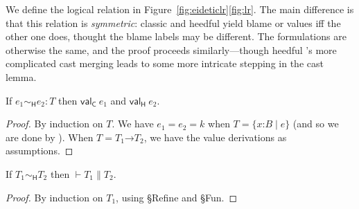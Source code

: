 \documentclass[9pt]{extarticle}
\newcommand{\reflr}{\ifpopl\ref{fig:eideticlr}\else\ref{fig:lr}\fi}
\newcommand{\ottnt}[1]{\mathit{#1}}
\newcommand{\ottsym}[1]{#1}
\begin{document}
{We define the logical relation in Figure~\reflr.
The main difference is that this relation is \textit{symmetric}:
classic and heedful \lambdah yield blame or values iff the other one
does, thought the blame labels may be different. The formulations are
otherwise the same, and the proof proceeds similarly---though heedful
\lambdah's more complicated cast merging leads to some more intricate
stepping in the cast lemma.

\begin{lemma}
  \label{lem:heedfullrvalue}
  If $ \ottnt{e_{{\mathrm{1}}}}   \sim _{  \mathsf{H}  }  \ottnt{e_{{\mathrm{2}}}}  :  \ottnt{T} $ then $ \mathsf{val} _{  \mathsf{C}  }~ \ottnt{e_{{\mathrm{1}}}} $ and $ \mathsf{val} _{  \mathsf{H}  }~ \ottnt{e_{{\mathrm{2}}}} $.
\begin{proof}
    By induction on $\ottnt{T}$. We have $\ottnt{e_{{\mathrm{1}}}}  \ottsym{=}  \ottnt{e_{{\mathrm{2}}}} = \ottnt{k}$ when $\ottnt{T}  \ottsym{=}   \{ \mathit{x} \mathord{:} \ottnt{B} \mathrel{\mid} \ottnt{e} \} $ (and so we are done by ). When $\ottnt{T}  \ottsym{=}   \ottnt{T_{{\mathrm{1}}}} \mathord{ \rightarrow } \ottnt{T_{{\mathrm{2}}}} $, we have the value derivations as assumptions.
  \end{proof}  
\end{lemma}

\begin{lemma}
  \label{lem:heedfullrsimilar}
  If $ \ottnt{T_{{\mathrm{1}}}}   \sim _{  \mathsf{H}  }  \ottnt{T_{{\mathrm{2}}}} $ then $\vdash  \ottnt{T_{{\mathrm{1}}}}  \mathrel{\parallel}  \ottnt{T_{{\mathrm{2}}}}$.
\begin{proof}
    By induction on $\ottnt{T_{{\mathrm{1}}}}$, using \S{Refine} and \S{Fun}.
  \end{proof}
\end{lemma}

}
\end{document}
